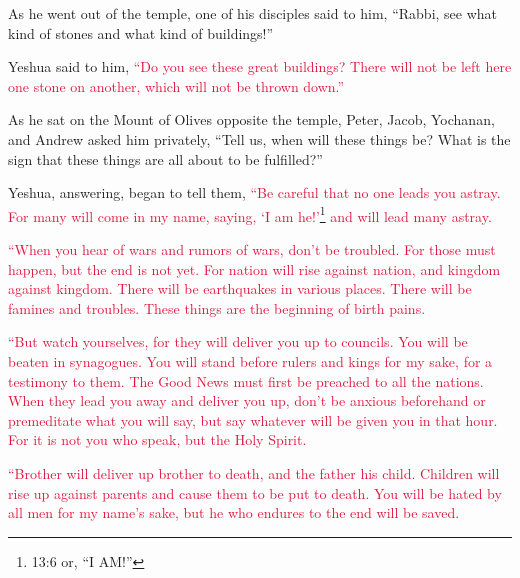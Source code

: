 \mychapter{} \myverse*{}As he went out of the temple, one of his disciples said to him,
“Rabbi, see what kind of stones and what kind of buildings!”

\myverse{}Yeshua said to him,
\textcolor{crimson}{“Do you see these great buildings? There will not be left here one stone on another, which will not
	be thrown down.”}

\myverse{}As he sat on the Mount of Olives opposite the temple, Peter, Jacob,
Yochanan, and Andrew asked him privately,
\myverse{}“Tell us, when will these things be? What is the sign that these things are
all about to be fulfilled?”

\myverse{}Yeshua, answering, began to tell them,
\textcolor{crimson}{“Be careful that no one leads you astray.
}
\myverse{}\textcolor{crimson}{For many will come in my name, saying, ‘I am he!’}\footnote{13:6 or, “I AM!”}
\textcolor{crimson}{and will lead many astray.}

\myverse{}\textcolor{crimson}{“When you hear of wars and rumors of wars, don’t be troubled.
	For those must happen, but the end is not yet.
}
\myverse{}\textcolor{crimson}{For nation will rise against nation, and kingdom against kingdom. There
	will be earthquakes in various places. There will be famines and troubles. These things are the beginning
	of birth pains.
}

\myverse{}\textcolor{crimson}{“But watch yourselves, for they will deliver you up to councils.
	You will be beaten in synagogues. You will stand before rulers and kings for my sake, for a testimony
	to them.
}
\myverse{}\textcolor{crimson}{The Good News must first be preached to all the nations.
}
\myverse{}\textcolor{crimson}{When they lead you away and deliver you up, don’t be anxious beforehand
	or premeditate what you will say, but say whatever will be given you in that hour. For it is not you who
	speak, but the Holy Spirit.}

\myverse{}\textcolor{crimson}{“Brother will deliver up brother to death, and the father
	his child. Children will rise up against parents and cause them to be put to death.
}
\myverse{}\textcolor{crimson}{You will be hated by all men for my name’s sake, but he who endures to
	the end will be saved.
}

